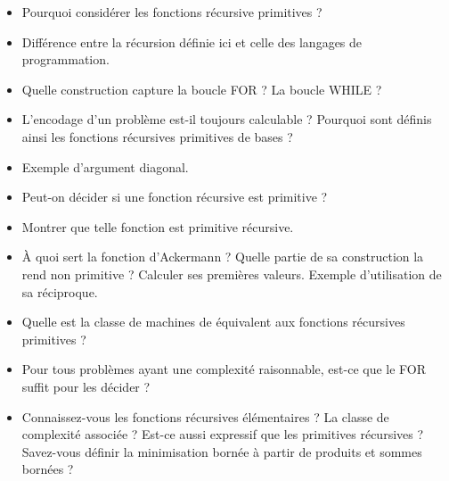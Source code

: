 \documentclass{agregfiche}
\begin{document}
\begin{itemize}
	\item Pourquoi considérer les fonctions récursive primitives ? %
	\item Différence entre la récursion définie ici et celle des langages de programmation.
        \item Quelle construction capture la boucle FOR ? La boucle WHILE
          ?
	\item L'encodage d'un problème est-il toujours calculable ?
          Pourquoi sont définis ainsi les fonctions récursives primitives
          de bases ?
	\item Exemple d'argument diagonal.
    \item Peut-on décider si une fonction récursive est primitive ?
	\item Montrer que telle fonction est primitive récursive.
    \item À quoi sert la fonction d'Ackermann ?  Quelle partie de sa 
    construction la rend non primitive ? Calculer ses premières 
    valeurs. Exemple d'utilisation de sa 
    réciproque. 
    \item Quelle est la classe de machines de  équivalent 
    aux fonctions récursives primitives ? %
    \item Pour tous problèmes ayant une complexité raisonnable,
      est-ce que le FOR suffit pour les décider ?
      
      \item Connaissez-vous les fonctions récursives élémentaires ? 
      La 
      classe de complexité associée ? Est-ce aussi expressif que les 
      primitives récursives ?
      Savez-vous définir la minimisation bornée à partir de produits 
      et sommes bornées ?

\end{itemize}
\end{document}
